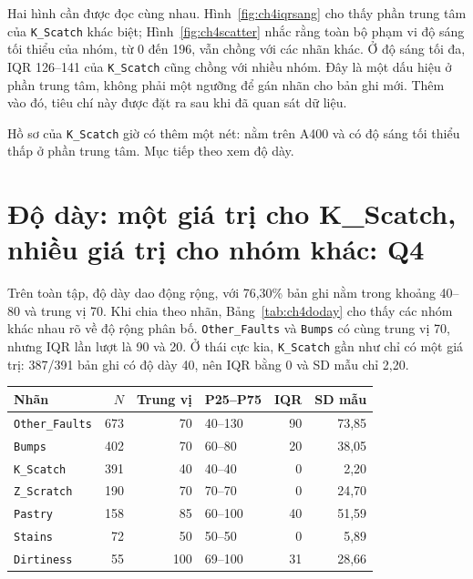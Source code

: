 \documentclass[12pt,a4paper,oneside]{report}
\newcommand{\maCot}[1]{{\urlstyle{tt}\def\UrlBreaks{\do\_\do\/\do\.}\def\UrlBigBreaks{}\nolinkurl{#1}}}
\begin{document}
Hai hình cần được đọc cùng nhau. Hình~\ref{fig:ch4iqrsang} cho thấy phần trung tâm của \maCot{K_Scatch} khác biệt; Hình~\ref{fig:ch4scatter} nhắc rằng toàn bộ phạm vi độ sáng tối thiểu của nhóm, từ 0 đến 196, vẫn chồng với các nhãn khác. Ở độ sáng tối đa, IQR 126--141 của \maCot{K_Scatch} cũng chồng với nhiều nhóm. Đây là một dấu hiệu ở phần trung tâm, không phải một ngưỡng để gán nhãn cho bản ghi mới. Thêm vào đó, tiêu chí này được đặt ra sau khi đã quan sát dữ liệu.

Hồ sơ của \maCot{K_Scatch} giờ có thêm một nét: nằm trên A400 và có độ sáng tối thiểu thấp ở phần trung tâm. Mục tiếp theo xem độ dày.

\section{Độ dày: một giá trị cho K\_Scatch, nhiều giá trị cho nhóm khác: Q4}
\label{sec:ch4q4}

Trên toàn tập, độ dày dao động rộng, với 76,30\% bản ghi nằm trong khoảng 40--80 và trung vị 70. Khi chia theo nhãn, Bảng~\ref{tab:ch4doday} cho thấy các nhóm khác nhau rõ về độ rộng phân bố. \maCot{Other_Faults} và \maCot{Bumps} có cùng trung vị 70, nhưng IQR lần lượt là 90 và 20. Ở thái cực kia, \maCot{K_Scatch} gần như chỉ có một giá trị: 387/391 bản ghi có độ dày 40, nên IQR bằng 0 và SD mẫu chỉ 2,20.

\begin{center}\begin{minipage}{\linewidth}
\label{tab:ch4doday}
\small{}
\begin{tabularx}{\linewidth}{@{}Y r r p{2.3cm}r r@{}}
\toprule
Nhãn & $N$ & Trung vị & P25--P75 & IQR & SD mẫu \\
\midrule
\maCot{Other_Faults} & 673 & 70 & 40--130 & 90 & 73,85 \\
\maCot{Bumps} & 402 & 70 & 60--80 & 20 & 38,05 \\
\maCot{K_Scatch} & 391 & 40 & 40--40 & 0 & 2,20 \\
\maCot{Z_Scratch} & 190 & 70 & 70--70 & 0 & 24,70 \\
\maCot{Pastry} & 158 & 85 & 60--100 & 40 & 51,59 \\
\maCot{Stains} & 72 & 50 & 50--50 & 0 & 5,89 \\
\maCot{Dirtiness} & 55 & 100 & 69--100 & 31 & 28,66 \\
\bottomrule
\end{tabularx}
\end{minipage}\end{center}
\end{document}
